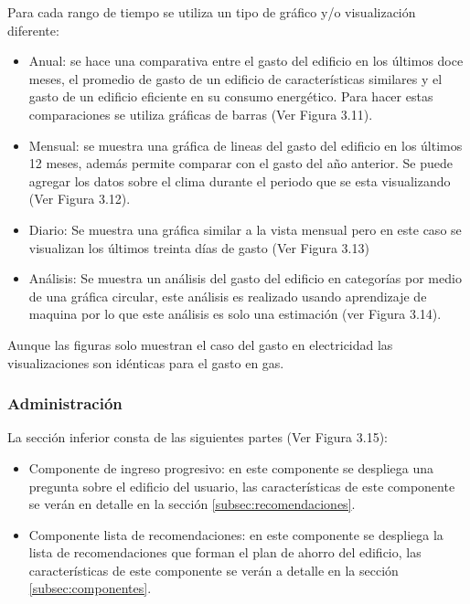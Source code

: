 
Para cada rango de tiempo se utiliza un tipo de gráfico y/o visualización diferente:

\begin{itemize}
\item Anual: se hace una comparativa entre el gasto del edificio en los últimos doce
  meses, el promedio de gasto de un edificio de características similares y
  el gasto de un edificio eficiente en su consumo energético. Para hacer estas
  comparaciones se utiliza gráficas de barras (Ver Figura 3.11).
\item Mensual: se muestra una gráfica de lineas del gasto del edificio
  en los últimos 12 meses, además permite comparar con el gasto del año anterior.
  Se puede agregar los datos sobre el clima durante el periodo que se esta
  visualizando (Ver Figura 3.12).
\item Diario: Se muestra una gráfica similar a la vista mensual pero en este caso
  se visualizan los últimos treinta días de gasto (Ver Figura 3.13)
\item Análisis: Se muestra un análisis del gasto del edificio en categorías
  por medio de una gráfica circular, este análisis es realizado usando
  aprendizaje de maquina por lo que este análisis es solo una estimación
  (ver Figura 3.14).
\end{itemize}

Aunque las figuras solo muestran el caso del gasto en electricidad las
visualizaciones son idénticas para el gasto en gas.

\subsubsection{Administración}

La sección inferior consta de las siguientes partes (Ver Figura 3.15):
\begin{itemize}
\item Componente de ingreso progresivo: en este componente se despliega una pregunta
  sobre el edificio del usuario, las características de este componente
  se verán en detalle en la sección \ref{subsec:recomendaciones}.
\item Componente lista de recomendaciones: en este componente se despliega la
  lista de recomendaciones que forman el plan de ahorro del edificio,
  las características de este componente se verán a detalle en la sección
  \ref{subsec:componentes}.
\end{itemize}

